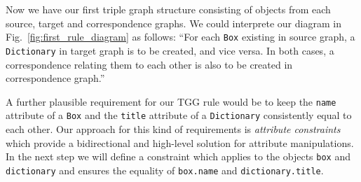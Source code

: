 Now we have our first triple graph structure consisting of objects from each source, target and correspondence graphs.
We could interprete our diagram in Fig.~\ref{fig:first_rule_diagram} as follows:
``For each \texttt{Box} existing in source graph, a \texttt{Dictionary} in target graph is to be created, and vice versa. 
In both cases, a correspondence relating them to each other is also to be created in correspondence graph.''

A further plausible requirement for our TGG rule would be to keep the \texttt{name} attribute of a \texttt{Box} and the \texttt{title} attribute of a \texttt{Dictionary} consistently equal to each other.
Our approach for this kind of requirements is \emph{attribute constraints} which provide a bidirectional and high-level solution for attribute manipulations.
In the next step we will define a constraint which applies to the objects \texttt{box} and \texttt{dictionary} and ensures the equality of \texttt{box.name} and \texttt{dictionary.title}.


